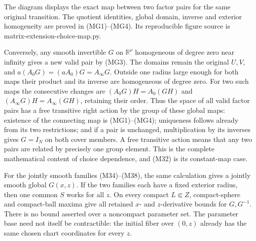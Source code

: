 \documentclass[
  11pt,
]{article}
\begin{document}
The diagram displays the exact map between two factor pairs for the same
original transition. The quotient identities, global domain, inverse and
exterior homogeneity are proved in (MG1)--(MG4). Its reproducible figure
source is matrix-extension-choice-map.py.

Conversely, any smooth invertible \(G\) on \(\mathbb R^\nu\) homogeneous
of degree zero near infinity gives a new valid pair by (MG3). The
domains remain the original \(U,V\), and \(a(A_0G)=(aA_0)G=A_\infty G\).
Outside one radius large enough for both maps their product and its
inverse are homogeneous of degree zero. For two such maps the
consecutive changes are \((A_0G)H=A_0(GH)\) and
\((A_\infty G)H=A_\infty(GH)\), retaining their order. Thus the space of
all valid factor pairs has a free transitive right action by the group
of these global maps: existence of the connecting map is (MG1)--(MG4);
uniqueness follows already from its two restrictions; and if a pair is
unchanged, multiplication by its inverses gives \(G=I_N\) on both cover
members. A free transitive action means that any two pairs are related
by precisely one group element. This is the complete mathematical
content of choice dependence, and (M32) is its constant-map case.

For the jointly smooth families (M34)--(M38), the same calculation gives
a jointly smooth global \(G(x,z)\). If the two families each have a
fixed exterior radius, then one common \(S\) works for all \(z\). On
every compact \(L\Subset Z\), compact-sphere and compact-ball maxima
give all retained \(x\)- and \(z\)-derivative bounds for \(G,G^{-1}\).
There is no bound asserted over a noncompact parameter set. The
parameter base need not itself be contractible: the initial fiber over
\((0,z)\) already has the same chosen chart coordinates for every \(z\).
\end{document}
